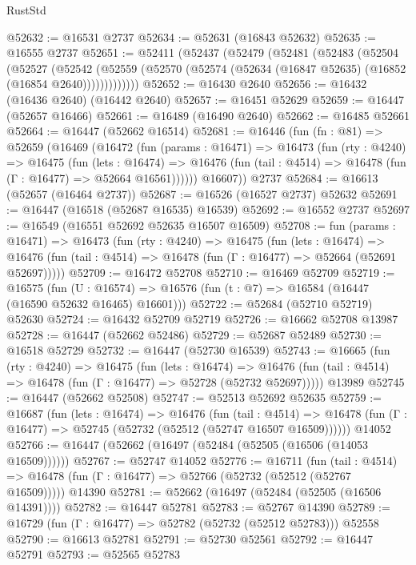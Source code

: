 \begin{lexlean}{RustStd}
\begin{coremodule}
@52632 := @16531 @2737
@52634 := @52631 (@16843 @52632)
@52635 := @16555 @2737
@52651 := @52411
    (@52437
      (@52479
        (@52481
          (@52483
            (@52504
              (@52527
                (@52542
                  (@52559 (@52570 (@52574 (@52634 (@16847 @52635) (@16852 (@16854 @2640)))))))))))))
@52652 := @16430 @2640
@52656 := @16432 (@16436 @2640) (@16442 @2640)
@52657 := @16451 @52629
@52659 := @16447 (@52657 @16466)
@52661 := @16489 (@16490 @2640)
@52662 := @16485 @52661
@52664 := @16447 (@52662 @16514)
@52681 := @16446
    (fun (fn : @81) =>
    @52659
      (@16469
        (@16472
          (fun (params : @16471) =>
          @16473
            (fun (rty : @4240) =>
            @16475
              (fun (lets : @16474) =>
              @16476 (fun (tail : @4514) => @16478 (fun (Γ : @16477) => @52664 @16561))))))
        @16607))
    @2737
@52684 := @16613 (@52657 (@16464 @2737))
@52687 := @16526 (@16527 @2737) @52632
@52691 := @16447 (@16518 (@52687 @16535) @16539)
@52692 := @16552 @2737
@52697 := @16549 (@16551 @52692 @52635 @16507 @16509)
@52708 := fun (params : @16471) =>
  @16473
    (fun (rty : @4240) =>
    @16475
      (fun (lets : @16474) =>
      @16476 (fun (tail : @4514) => @16478 (fun (Γ : @16477) => @52664 (@52691 @52697)))))
@52709 := @16472 @52708
@52710 := @16469 @52709
@52719 := @16575
    (fun (U : @16574) => @16576 (fun (t : @7) => @16584 (@16447 (@16590 @52632 @16465) @16601)))
@52722 := @52684 (@52710 @52719) @52630
@52724 := @16432 @52709 @52719
@52726 := @16662 @52708 @13987
@52728 := @16447 (@52662 @52486)
@52729 := @52687 @52489
@52730 := @16518 @52729
@52732 := @16447 (@52730 @16539)
@52743 := @16665
    (fun (rty : @4240) =>
    @16475
      (fun (lets : @16474) =>
      @16476 (fun (tail : @4514) => @16478 (fun (Γ : @16477) => @52728 (@52732 @52697)))))
    @13989
@52745 := @16447 (@52662 @52508)
@52747 := @52513 @52692 @52635
@52759 := @16687
    (fun (lets : @16474) =>
    @16476
      (fun (tail : @4514) =>
      @16478 (fun (Γ : @16477) => @52745 (@52732 (@52512 (@52747 @16507 @16509))))))
    @14052
@52766 := @16447 (@52662 (@16497 (@52484 (@52505 (@16506 (@14053 @16509))))))
@52767 := @52747 @14052
@52776 := @16711
    (fun (tail : @4514) => @16478 (fun (Γ : @16477) => @52766 (@52732 (@52512 (@52767 @16509)))))
    @14390
@52781 := @52662 (@16497 (@52484 (@52505 (@16506 @14391))))
@52782 := @16447 @52781
@52783 := @52767 @14390
@52789 := @16729 (fun (Γ : @16477) => @52782 (@52732 (@52512 @52783))) @52558
@52790 := @16613 @52781
@52791 := @52730 @52561
@52792 := @16447 @52791
@52793 := @52565 @52783

\end{coremodule}
\end{lexlean}
